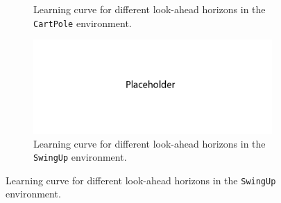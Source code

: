 \documentclass{article}
\begin{document}
\begin{figure}[h!]
\begin{subfigure}{0.45\textwidth}
        \caption{Learning curve for different look-ahead horizons in the \texttt{CartPole} environment.}
    \end{subfigure}
    \hspace{0.2 in}
    \begin{subfigure}{0.45\textwidth}
        \centering
        \includegraphics[width=\textwidth]{figures/placeholder_2.png}
        \caption{Learning curve for different look-ahead horizons in the \texttt{SwingUp} environment.}
    \end{subfigure}
\end{figure}

\newpage 
\newpage
{}
\end{document}
